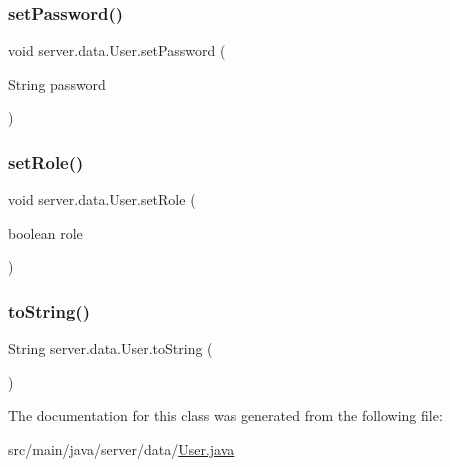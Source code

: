 \mbox{\label{classserver_1_1data_1_1_user_a694f243c23ff0620fb683b56f000efc2}} 
\subsubsection{\texorpdfstring{set\+Password()}{setPassword()}}
{\footnotesize\ttfamily void server.\+data.\+User.\+set\+Password (\begin{DoxyParamCaption}\item[{String}]{password }\end{DoxyParamCaption})}

\mbox{\label{classserver_1_1data_1_1_user_af2ed33ffa1d69585d758713f77b5b079}} 
\subsubsection{\texorpdfstring{set\+Role()}{setRole()}}
{\footnotesize\ttfamily void server.\+data.\+User.\+set\+Role (\begin{DoxyParamCaption}\item[{boolean}]{role }\end{DoxyParamCaption})}

\mbox{\label{classserver_1_1data_1_1_user_a003500665bb10c335b8d14c1c8fc511e}} 
\subsubsection{\texorpdfstring{to\+String()}{toString()}}
{\footnotesize\ttfamily String server.\+data.\+User.\+to\+String (\begin{DoxyParamCaption}{ }\end{DoxyParamCaption})}



The documentation for this class was generated from the following file\+:\begin{DoxyCompactItemize}
\item 
src/main/java/server/data/\hyperlink{_user_8java}{User.\+java}\end{DoxyCompactItemize}
